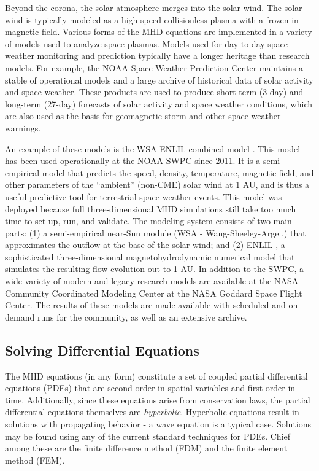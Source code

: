 \documentclass{article}
\begin{document}
Beyond the corona, the solar atmosphere merges into the solar wind. The solar wind is typically modeled as a high-speed collisionless plasma with a frozen-in magnetic field. Various forms of the MHD equations are implemented in a variety of models used to analyze space plasmas. Models used for day-to-day space weather monitoring and prediction typically have a longer heritage than research models. For example, the NOAA Space Weather Prediction Center \cite{swpc} maintains a stable of operational models and a large archive of historical data of solar activity and space weather. These products are used to produce short-term (3-day) and long-term (27-day) forecasts of solar activity and space weather conditions, which are also used as the basis for geomagnetic storm and other space weather warnings.

An example of these models is the WSA-ENLIL combined model \cite{wsaenlil}. This model has been used operationally at the NOAA SWPC since 2011. It is a semi-empirical model that predicts the speed, density, temperature, magnetic field, and other parameters of the “ambient” (non-CME) solar wind at 1 AU, and is thus a useful predictive tool for terrestrial space weather events. This model was deployed because full three-dimensional MHD simulations still take too much time to set up, run, and validate. The modeling system consists of two main parts: (1)  a semi-empirical near-Sun module (WSA - Wang-Sheeley-Arge \cite{Arge2000},\cite{SheeleyJr2017}) that approximates the outflow at the base of the solar wind; and (2) ENLIL \cite{enlil}, a sophisticated three-dimensional magnetohydrodynamic numerical model that simulates the resulting flow  evolution out to 1 AU. In addition to the SWPC, a wide variety of modern and legacy research models are available at the NASA Community Coordinated Modeling Center \cite{ccmc} at the NASA Goddard Space Flight Center. The results of these models are made available with scheduled and on-demand runs for the community, as well as an extensive archive.

\subsection{Solving Differential Equations}

The MHD equations (in any form) constitute a set of coupled partial differential equations (PDEs) that are second-order in spatial variables and first-order in time. Additionally, since these equations arise from conservation laws, the partial differential equations themselves are \textit{hyperbolic}. Hyperbolic equations result in solutions with propagating behavior - a wave equation is a typical case. Solutions may be found using any of the current standard techniques for PDEs. Chief among these are the finite difference method (FDM) and the finite element method (FEM).
\end{document}
